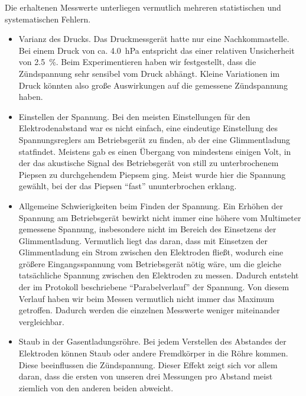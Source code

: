 \documentclass{article}
\begin{document}
Die erhaltenen Messwerte unterliegen vermutlich mehreren statistischen und
systematischen Fehlern.
\begin{itemize}
    \item Varianz des Drucks. Das Druckmessgerät hatte nur eine Nachkommastelle.
    Bei einem Druck von ca. \qty{4,0}{hPa} entspricht das einer relativen Unsicherheit
    von \qty{2.5}{\percent}. Beim Experimentieren haben wir festgestellt, dass
    die Zündspannung sehr sensibel vom Druck abhängt. Kleine Variationen im Druck
    könnten also große Auswirkungen auf die gemessene Zündspannung haben.

    \item Einstellen der Spannung. Bei den meisten Einstellungen für den
    Elektrodenabstand war es nicht einfach, eine eindeutige Einstellung des
    Spannungsreglers am Betriebsgerät zu finden, ab der eine Glimmentladung
    statfindet. Meistens gab es einen Übergang von mindestens einigen Volt,
    in der das akustische Signal des Betriebsgerät von still zu unterbrochenem
    Piepsen zu durchgehendem Piepsem ging. Meist wurde hier die Spannung gewählt,
    bei der das Piepsen ``fast'' ununterbrochen erklang.

    \item Allgemeine Schwierigkeiten beim Finden der Spannung.
    Ein Erhöhen der Spannung am Betriebsgerät bewirkt nicht immer eine
    höhere vom Multimeter gemessene Spannung, insbesondere nicht im Bereich des
    Einsetzens der Glimmentladung. Vermutlich liegt das daran, dass mit Einsetzen
    der Glimmentladung ein Strom zwischen den Elektroden fließt, wodurch eine größere
    Eingangsspannung vom Betriebsgerät nötig wäre, um die gleiche tatsächliche
    Spannung zwischen den Elektroden zu messen. Dadurch entsteht der im Protokoll
    beschriebene ``Parabelverlauf'' der Spannung. Von diesem Verlauf haben wir beim
    Messen vermutlich nicht immer das Maximum getroffen. Dadurch werden die
    einzelnen Messwerte weniger miteinander vergleichbar.

    \item Staub in der Gasentladungsröhre. Bei jedem Verstellen des Abstandes
    der Elektroden können Staub oder andere Fremdkörper in die Röhre kommen.
    Diese beeinflussen die Zündspannung. Dieser Effekt zeigt sich vor allem daran,
    dass die ersten von unseren drei Messungen pro Abstand meist ziemlich von den
    anderen beiden abweicht.
\end{itemize}
\end{document}
